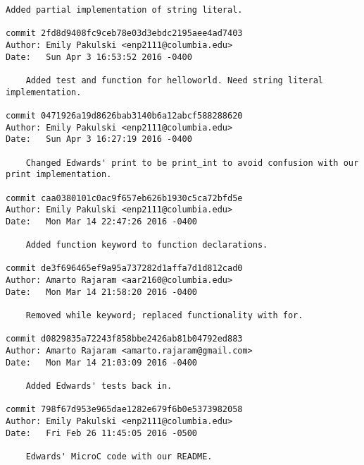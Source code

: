 \begin{lstlisting}[backgroundcolor=\color{white}]
    Added partial implementation of string literal.

commit 2fd8d9408fc9ceb78e03d3ebdc2195aee4ad7403
Author: Emily Pakulski <enp2111@columbia.edu>
Date:   Sun Apr 3 16:53:52 2016 -0400

    Added test and function for helloworld. Need string literal implementation.

commit 0471926a19d8626bab3140b6a12abcf588288620
Author: Emily Pakulski <enp2111@columbia.edu>
Date:   Sun Apr 3 16:27:19 2016 -0400

    Changed Edwards' print to be print_int to avoid confusion with our print implementation.

commit caa0380101c0ac9f657eb626b1930c5ca72bfd5e
Author: Emily Pakulski <enp2111@columbia.edu>
Date:   Mon Mar 14 22:47:26 2016 -0400

    Added function keyword to function declarations.

commit de3f696465ef9a95a737282d1affa7d1d812cad0
Author: Amarto Rajaram <aar2160@columbia.edu>
Date:   Mon Mar 14 21:58:20 2016 -0400

    Removed while keyword; replaced functionality with for.

commit d0829835a72243f858bbe2426ab81b04792ed883
Author: Amarto Rajaram <amarto.rajaram@gmail.com>
Date:   Mon Mar 14 21:03:09 2016 -0400

    Added Edwards' tests back in.

commit 798f67d953e965dae1282e679f6b0e5373982058
Author: Emily Pakulski <enp2111@columbia.edu>
Date:   Fri Feb 26 11:45:05 2016 -0500

    Edwards' MicroC code with our README.

    \end{lstlisting}

